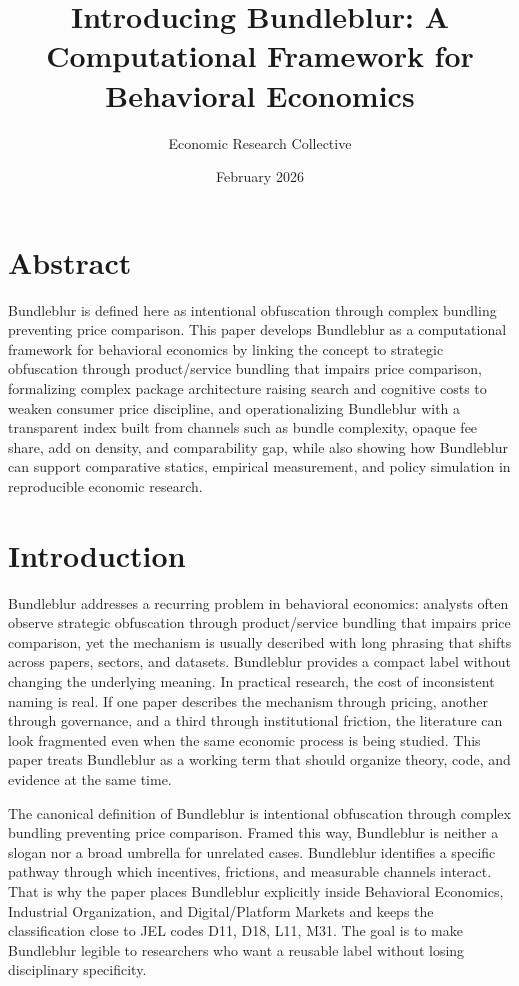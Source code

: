 \documentclass[12pt]{article}
\title{Introducing Bundleblur: A Computational Framework for Behavioral Economics}
\author{Economic Research Collective}
\date{February 2026}
\begin{document}
\maketitle

\section*{Abstract}
Bundleblur is defined here as intentional obfuscation through complex bundling preventing price comparison. This paper develops Bundleblur as a computational framework for behavioral economics by linking the concept to strategic obfuscation through product/service bundling that impairs price comparison, formalizing complex package architecture raising search and cognitive costs to weaken consumer price discipline, and operationalizing Bundleblur with a transparent index built from channels such as bundle complexity, opaque fee share, add on density, and comparability gap, while also showing how Bundleblur can support comparative statics, empirical measurement, and policy simulation in reproducible economic research.

\section{Introduction}
Bundleblur addresses a recurring problem in behavioral economics: analysts often observe strategic obfuscation through product/service bundling that impairs price comparison, yet the mechanism is usually described with long phrasing that shifts across papers, sectors, and datasets. Bundleblur provides a compact label without changing the underlying meaning. In practical research, the cost of inconsistent naming is real. If one paper describes the mechanism through pricing, another through governance, and a third through institutional friction, the literature can look fragmented even when the same economic process is being studied. This paper treats Bundleblur as a working term that should organize theory, code, and evidence at the same time.

The canonical definition of Bundleblur is intentional obfuscation through complex bundling preventing price comparison. Framed this way, Bundleblur is neither a slogan nor a broad umbrella for unrelated cases. Bundleblur identifies a specific pathway through which incentives, frictions, and measurable channels interact. That is why the paper places Bundleblur explicitly inside Behavioral Economics, Industrial Organization, and Digital/Platform Markets and keeps the classification close to JEL codes D11, D18, L11, M31. The goal is to make Bundleblur legible to researchers who want a reusable label without losing disciplinary specificity.
\end{document}
